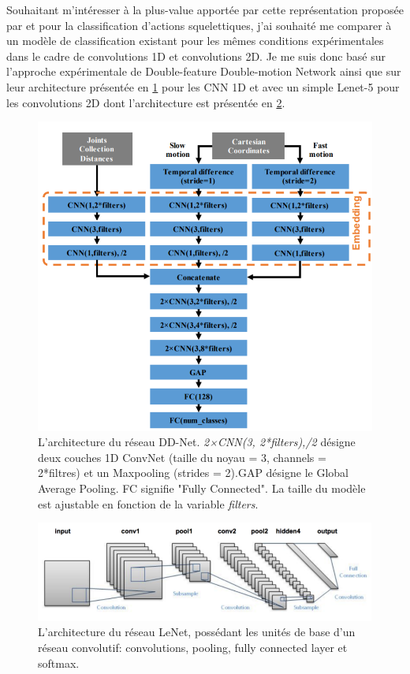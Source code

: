 Souhaitant m'intéresser à la plus-value apportée par cette représentation proposée par \cite{liu2016spatio} et \cite{2018arXiv180110304Y} pour la classification d'actions squelettiques, j'ai souhaité me comparer à un modèle de classification existant pour les mêmes conditions expérimentales dans le cadre de convolutions 1D et convolutions 2D. Je me suis donc basé sur l'approche expérimentale de Double-feature Double-motion Network \cite{2019arXiv190709658Y} ainsi que sur leur architecture présentée en \ref{fig:DDnet} pour les CNN 1D et avec un simple Lenet-5 \cite{lecun1998gradient} pour les convolutions 2D dont l'architecture est présentée en \ref{fig:Lenet}.


\begin{figure}[H]
    \centering
    \includegraphics[width=0.55\linewidth]{Images/ddnet.png}
    \caption{L'architecture du réseau DD-Net. \textit{2×CNN(3,
2*filters),/2} désigne deux couches 1D ConvNet (taille du noyau
= 3, channels = 2*filtres) et un Maxpooling (strides = 2).GAP
désigne le Global Average Pooling. FC signifie "Fully Connected". La taille du modèle est ajustable en fonction de la variable \textit{filters}.}
    \label{fig:DDnet}
\end{figure}

\begin{figure}[H]
    \centering
    \includegraphics[width=0.85\linewidth]{Images/lenet_architecture.png}
    \caption{L'architecture du réseau LeNet, possédant les unités de base d'un réseau convolutif: convolutions, pooling, fully connected layer et softmax.}
    \label{fig:Lenet}
\end{figure}

